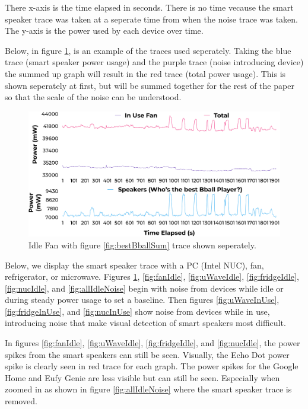There x-axis is the time elapsed in seconds. There is no time vecause the smart speaker trace was taken at a seperate time from when the noise trace was taken. The y-axis is the power used by each device over time.

Below, in figure \ref{fig:fanIdleSeperate}, is an example of the traces used seperately. Taking the blue trace (smart speaker power usage) and the purple trace (noise introducing device) the summed up graph will result in the red trace (total power usage). This is shown seperately at first, but will be summed together for the rest of the paper so that the scale of the noise can be understood.

\begin{figure}[H]
  \centering
  \includegraphics[width=1\textwidth]{figures/inUseFanNoiseSeperate.png}
  \caption{Idle Fan with figure \ref{fig:bestBballSum} trace shown seperately.}
  \label{fig:fanIdleSeperate}
\end{figure}

Below, we display the smart speaker trace with a PC (Intel NUC), fan, refrigerator, or microwave. Figures \ref{fig:fanIdleSeperate}, \ref{fig:fanIdle}, \ref{fig:uWaveIdle}, \ref{fig:fridgeIdle}, \ref{fig:nucIdle}, and \ref{fig:allIdleNoise} begin with noise from devices while idle or during steady power usage to set a baseline. Then figures \ref{fig:uWaveInUse}, \ref{fig:fridgeInUse}, and \ref{fig:nucInUse} show noise from devices while in use, introducing noise that make visual detection of smart speakers most difficult.

In figures \ref{fig:fanIdle}, \ref{fig:uWaveIdle}, \ref{fig:fridgeIdle}, and \ref{fig:nucIdle}, the power spikes from the smart speakers can still be seen. Visually, the Echo Dot power spike is clearly seen in red trace for each graph. The power spikes for the Google Home and Eufy Genie are less visible but can still be seen. Especially when zoomed in as shown in figure \ref{fig:allIdleNoise} where the smart speaker trace is removed.

